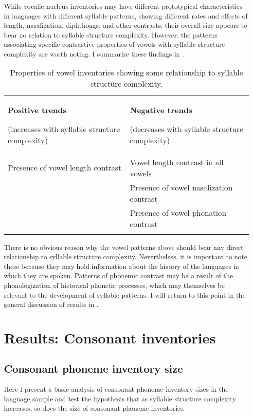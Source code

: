   While vocalic nucleus inventories may have different prototypical characteristics in languages with different syllable patterns, showing different rates and effects of length, nasalization, diphthongs, and other contrasts, their overall size appears to bear no relation to syllable structure complexity. However, the patterns associating specific contrastive properties of vowels with syllable structure complexity are worth noting. I summarize these findings in .

\begin{table}
\begin{tabularx}{\textwidth}{XX}
\lsptoprule

\textbf{Positive trends}

(increases with syllable structure complexity) & \textbf{Negative trends}

(decreases with syllable structure complexity)\\
Presence of vowel length contrast & Vowel length contrast in all vowels\\
& Presence of vowel nasalization contrast\\
& Presence of vowel phonation contrast\\
\lspbottomrule
\end{tabularx}
\caption{\label{tab:4.8}Properties of vowel inventories showing some relationship to syllable structure complexity.}
\end{table}

  There is no obvious reason why the vowel patterns above should bear any direct relationship to syllable structure complexity. Nevertheless, it is important to note these because they may hold information about the history of the languages in which they are spoken. Patterns of phonemic contrast may be a result of the phonologization of historical phonetic processes, which may themselves be relevant to the development of syllable patterns. I will return to this point in the general discussion of results in .

\section{Results: Consonant inventories}\label{sec:4.4}
\subsection{Consonant phoneme inventory size}\label{sec:4.4.1}

  Here I present a basic analysis of consonant phoneme inventory sizes in the language sample and test the hypothesis that as syllable structure complexity increases, so does the size of consonant phoneme inventories.


